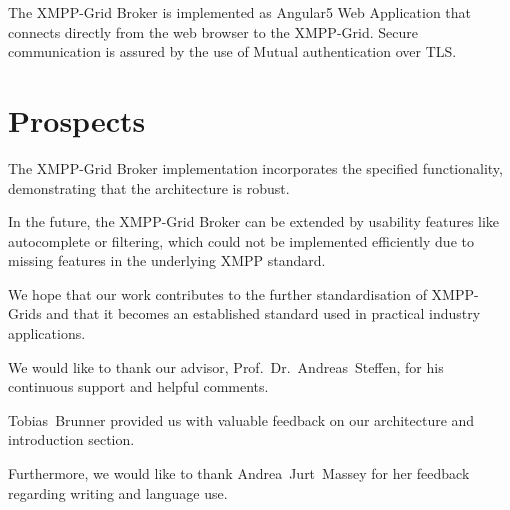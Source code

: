 The XMPP-Grid Broker is implemented as Angular5 Web Application that connects directly from the web browser to the XMPP-Grid. Secure communication is assured by the use of Mutual authentication over TLS.

\section*{Prospects}

The XMPP-Grid Broker implementation incorporates the specified functionality, demonstrating that the architecture is robust.

In the future, the XMPP-Grid Broker can be extended by usability features like autocomplete or filtering, which could not be implemented efficiently due to missing features in the underlying XMPP standard.

We hope that our work contributes to the further standardisation of XMPP-Grids and that it becomes an established standard used in practical industry applications.


\begin{acknowledgements}
\addchaptertocentry{\acknowledgementname} %
We would like to thank our advisor, Prof.~Dr.~Andreas~Steffen, for his continuous support and helpful comments.

Tobias~Brunner provided us with valuable feedback on our architecture and introduction section.

Furthermore, we would like to thank Andrea~Jurt~Massey for her feedback regarding writing and language use.
\end{acknowledgements}


\setcounter{tocdepth}{2}
\tableofcontents %



